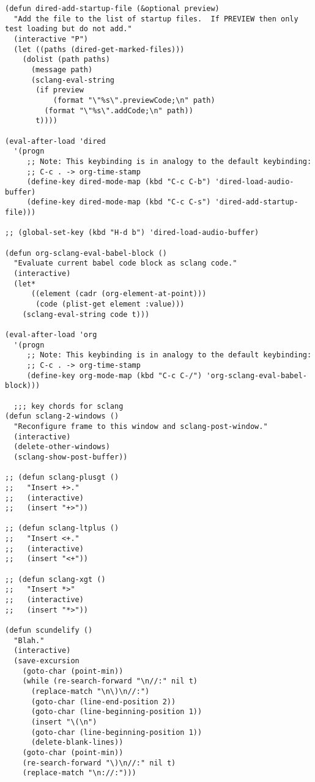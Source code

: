 \documentclass[11pt]{article}
\begin{document}
\begin{verbatim}
(defun dired-add-startup-file (&optional preview)
  "Add the file to the list of startup files.  If PREVIEW then only test loading but do not add."
  (interactive "P")
  (let ((paths (dired-get-marked-files)))
    (dolist (path paths)
      (message path)
      (sclang-eval-string
       (if preview
           (format "\"%s\".previewCode;\n" path)
         (format "\"%s\".addCode;\n" path))
       t))))

(eval-after-load 'dired
  '(progn
     ;; Note: This keybinding is in analogy to the default keybinding:
     ;; C-c . -> org-time-stamp
     (define-key dired-mode-map (kbd "C-c C-b") 'dired-load-audio-buffer)
     (define-key dired-mode-map (kbd "C-c C-s") 'dired-add-startup-file)))

;; (global-set-key (kbd "H-d b") 'dired-load-audio-buffer)

(defun org-sclang-eval-babel-block ()
  "Evaluate current babel code block as sclang code."
  (interactive)
  (let*
      ((element (cadr (org-element-at-point)))
       (code (plist-get element :value)))
    (sclang-eval-string code t)))

(eval-after-load 'org
  '(progn
     ;; Note: This keybinding is in analogy to the default keybinding:
     ;; C-c . -> org-time-stamp
     (define-key org-mode-map (kbd "C-c C-/") 'org-sclang-eval-babel-block)))

  ;;; key chords for sclang
(defun sclang-2-windows ()
  "Reconfigure frame to this window and sclang-post-window."
  (interactive)
  (delete-other-windows)
  (sclang-show-post-buffer))

;; (defun sclang-plusgt ()
;;   "Insert +>."
;;   (interactive)
;;   (insert "+>"))

;; (defun sclang-ltplus ()
;;   "Insert <+."
;;   (interactive)
;;   (insert "<+"))

;; (defun sclang-xgt ()
;;   "Insert *>"
;;   (interactive)
;;   (insert "*>"))

(defun scundelify ()
  "Blah."
  (interactive)
  (save-excursion
    (goto-char (point-min))
    (while (re-search-forward "\n//:" nil t)
      (replace-match "\n\)\n//:")
      (goto-char (line-end-position 2))
      (goto-char (line-beginning-position 1))
      (insert "\(\n")
      (goto-char (line-beginning-position 1))
      (delete-blank-lines))
    (goto-char (point-min))
    (re-search-forward "\)\n//:" nil t)
    (replace-match "\n://:")))


\end{verbatim}
\end{document}
